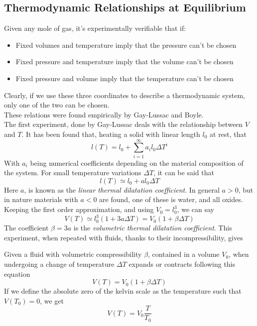 \documentclass[../qm.tex]{subfiles}
\begin{document}
\subsection{Thermodynamic Relationships at Equilibrium}
Given any mole of gas, it's experimentally verifiable that if:
\begin{itemize}
\item Fixed volumes and temperature imply that the pressure can't be chosen
\item Fixed pressure and temperature imply that the volume can't be chosen
\item Fixed pressure and volume imply that the temperature can't be chosen
\end{itemize}
Clearly, if we use these three coordinates to describe a thermodynamic system, only one of the two can be chosen.\\
These relations were found empirically by Gay-Lussac and Boyle.\\
The first experiment, done by Gay-Lussac deals with the relationship between $V$ and $T$. It has been found that, heating a solid with linear length $l_0$ at rest, that
\begin{equation}
	l(T)=l_0+\sum_{i=1}^\infty a_il_0\Delta T^i
	\label{eq:thermalexp.temp}
\end{equation}
With $a_i$ being numerical coefficients depending on the material composition of the system. For small temperature variations $\Delta T$, it can be said that
\begin{equation}
	l(T)\simeq l_0+al_0\Delta T
	\label{eq:firstorderexp.temp}
\end{equation}
Here $a$, is known as the \textit{linear thermal dilatation coefficient}. In general $a>0$, but in nature materials with $a<0$ are found, one of these is water, and all oxides.\\
Keeping the first order approximation, and using $V_0=l_0^3$, we can say
\begin{equation}
	V(T)\simeq l_0^3\left( 1+3a\Delta T \right)=V_0\left( 1+\beta\Delta T \right)
	\label{eq:volexp.temp}
\end{equation}
The coefficient $\beta=3a$ is the \textit{volumetric thermal dilatation coefficient}. This experiment, when repeated with fluids, thanks to their incompressibility, gives 
\begin{thm}
	Given a fluid with volumetric compressibility $\beta$, contained in a volume $V_0$, when undergoing a change of temperature $\Delta T$ expands or contracts following this equation
	\begin{equation}
		V(T)=V_0\left( 1+\beta\Delta T \right)
		\label{eq:gaylussac1c.temp}
	\end{equation}
	If we define the absolute zero of the kelvin scale as the temperature such that $V(T_0)=0$, we get
	\begin{equation}
		V(T)=V_0\frac{T}{T_0}
		\label{eq:gaylussac1k.temp}
	\end{equation}
\end{thm}
\end{document}
